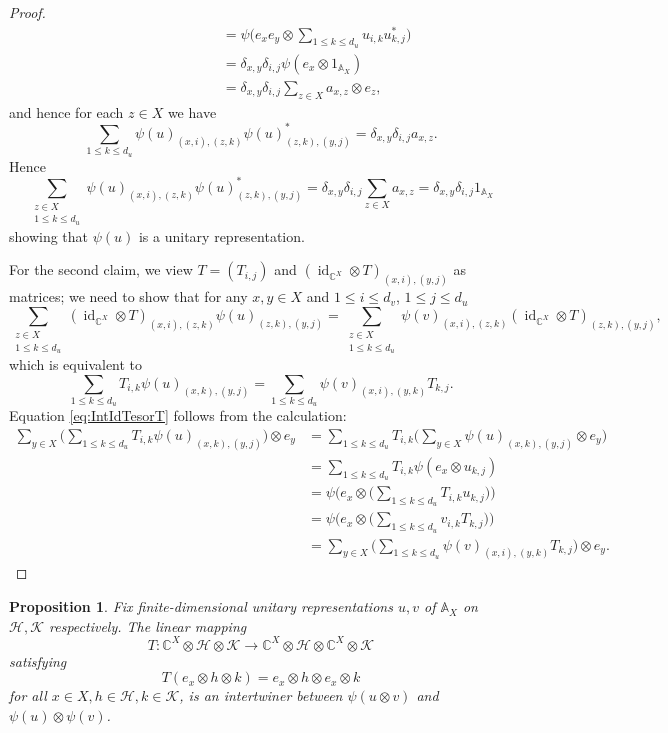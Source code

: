 \documentclass[12pt, a4paper]{amsart}
\def\id{\operatorname{id}}
\def\A{\mathbb{A}}
\def\C{\mathbb{C}}
\def\HH{\mathcal{H}}
\def\KK{\mathcal{K}}
\newtheorem{prop}[thm]{Proposition}
\theoremstyle{definition}
\theoremstyle{remark}
\numberwithin{equation}{section}
\begin{document}
\begin{proof}
\begin{align*}
		&\hspace{3cm}=\psi\Big(e_xe_y\otimes\sum_{1\le k\le d_u}u_{i,k}u_{k,j}^*\Big)\\
		&\hspace{3cm}=\delta_{x,y}\delta_{i,j}\psi(e_x\otimes 1_{\mathbb{A}_X})\\
		&\hspace{3cm}=\delta_{x,y}\delta_{i,j} \sum_{z\in X}a_{x,z}\otimes e_z,
	\end{align*}
	and hence for each $z\in X$ we have 
	\[
	\sum_{1\le k\le d_u}\psi(u)_{(x,i),(z,k)}\psi(u)_{(z,k),(y,j)}^*=\delta_{x,y}\delta_{i,j} a_{x,z}.
	\]
	Hence 
	\[
	\sum_{\substack{z\in X\\ 1\le k\le d_u}}\psi(u)_{(x,i),(z,k)}\psi(u)_{(z,k),(y,j)}^*=\delta_{x,y}\delta_{i,j}\sum_{z\in X}a_{x,z}=\delta_{x,y}\delta_{i,j}1_{\mathbb{A}_X}
	\]
	showing that $\psi(u)$ is a unitary representation. 
	
	For the second claim, we view $T=(T_{i,j})$ and $(\id_{\C^X}\otimes T)_{(x,i),(y,j)}$ as matrices; we need to show that for any $x,y\in X$ and $1\leq i \leq d_v$, $1\leq j \leq d_u$
	\[
	\sum_{\substack{z\in X\\ 1\le k\le d_u}}(\id_{\C^X}\otimes T)_{(x,i),(z,k)}\psi(u)_{(z,k),(y,j)}=\sum_{\substack{z\in X\\ 1\le k\le d_u}}\psi(v)_{(x,i),(z,k)}(\id_{\C^X}\otimes T)_{(z,k),(y,j)},
	\]
	which is equivalent to 
	\begin{equation}\label{eq:IntIdTesorT}
		\sum_{1\le k\le d_u}T_{i,k}\psi(u)_{(x,k),(y,j)}=\sum_{1\le k\le d_u}\psi(v)_{(x,i),(y,k)}T_{k,j}.
	\end{equation}
	Equation \ref{eq:IntIdTesorT} follows from the calculation:
	\begin{align*}
		\sum_{y\in X}\Big(\sum_{1\le k\le d_u}T_{i,k}\psi(u)_{(x,k),(y,j)}\Big)\otimes e_y 
		&= \sum_{1\le k\le d_u}T_{i,k}\Big(\sum_{y\in X}\psi(u)_{(x,k),(y,j)}\otimes e_y\Big)\\
		&= \sum_{1\le k\le d_u}T_{i,k}\psi(e_x\otimes u_{k,j})\\
		&=\psi\Big(e_x\otimes \Big(\sum_{1\le k\le d_u}T_{i,k}u_{k,j}\Big)\Big)\\
		&=\psi\Big(e_x\otimes \Big(\sum_{1\le k\le d_u}v_{i,k}T_{k,j}\Big)\Big)\\
		&=\sum_{y\in X}\Big(\sum_{1\le k\le d_u}\psi(v)_{(x,i),(y,k)}T_{k,j}\Big)\otimes e_y.
	\end{align*}
\end{proof}

\begin{prop} \label{prop:psirep}
	Fix finite-dimensional unitary representations $u, v$ of $\A_X$ on $\HH, \KK$ respectively. The linear mapping
	\[
	T: \C^X\otimes\HH\otimes\KK \to \C^X\otimes\HH\otimes\C^X\otimes\KK
	\]
	satisfying
	\[
	T(e_x\otimes h\otimes k) =e_x\otimes h\otimes e_x \otimes k
	\]
	for all $x\in X,h\in\HH,k\in\KK$, is an intertwiner between $\psi(u\otimes v)$ and $\psi(u)\otimes\psi(v)$.
\end{prop}
\end{document}
